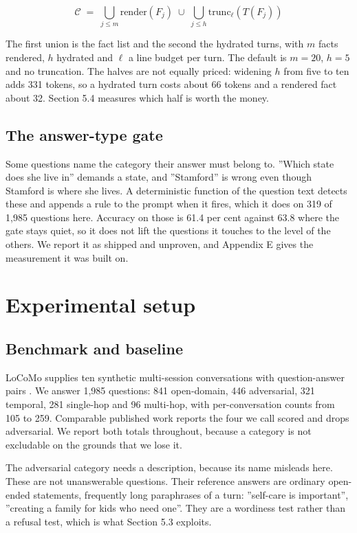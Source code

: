 \documentclass[10pt,a4paper,twocolumn]{article}
\begin{document}
\begin{equation}\label{equation:hydration}
\mathcal{C} \;=\; \bigcup_{j \leq m} \mathrm{render}(F_j) \;\cup\; \bigcup_{j \leq h} \mathrm{trunc}_{\ell}(T(F_j))
\end{equation}

The first union is the fact list and the second the hydrated turns, with $m$ facts rendered, $h$ hydrated and $\ell$ a line budget per turn. The default is $m = 20$, $h = 5$ and no truncation. The halves are not equally priced: widening $h$ from five to ten adds 331 tokens, so a hydrated turn costs about 66 tokens and a rendered fact about 32. Section 5.4 measures which half is worth the money.

\subsection{The answer-type gate}

Some questions name the category their answer must belong to. ''Which state does she live in'' demands a state, and ''Stamford'' is wrong even though Stamford is where she lives. A deterministic function of the question text detects these and appends a rule to the prompt when it fires, which it does on 319 of 1,985 questions here. Accuracy on those is 61.4 per cent against 63.8 where the gate stays quiet, so it does not lift the questions it touches to the level of the others. We report it as shipped and unproven, and Appendix E gives the measurement it was built on.

\section{Experimental setup}

\subsection{Benchmark and baseline}

LoCoMo supplies ten synthetic multi-session conversations with question-answer pairs \citep{maharana2024}. We answer 1,985 questions: 841 open-domain, 446 adversarial, 321 temporal, 281 single-hop and 96 multi-hop, with per-conversation counts from 105 to 259. Comparable published work reports the four we call scored and drops adversarial. We report both totals throughout, because a category is not excludable on the grounds that we lose it.

The adversarial category needs a description, because its name misleads here. These are not unanswerable questions. Their reference answers are ordinary open-ended statements, frequently long paraphrases of a turn: ''self-care is important'', ''creating a family for kids who need one''. They are a wordiness test rather than a refusal test, which is what Section 5.3 exploits.
\end{document}
